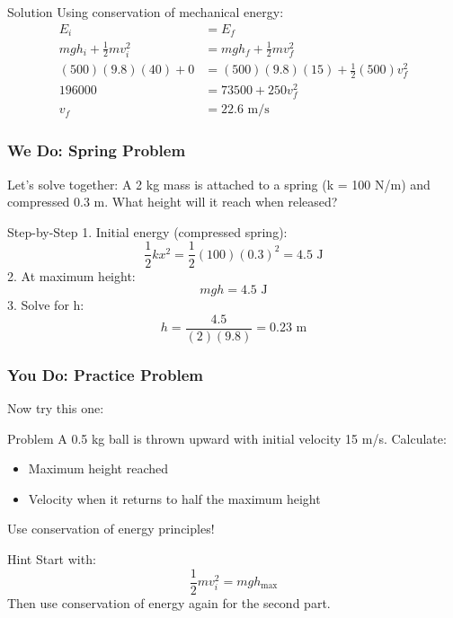 \documentclass{beamer}
\begin{document}
\begin{frame}
\begin{block}{Solution}
Using conservation of mechanical energy:
\begin{align*}
E_i &= E_f \\
mgh_i + \frac{1}{2}mv_i^2 &= mgh_f + \frac{1}{2}mv_f^2 \\
(500)(9.8)(40) + 0 &= (500)(9.8)(15) + \frac{1}{2}(500)v_f^2 \\
196000 &= 73500 + 250v_f^2 \\
v_f &= 22.6 \text{ m/s}
\end{align*}
\end{block}
\end{frame}

\begin{frame}
\frametitle{We Do: Spring Problem}
Let's solve together: A 2 kg mass is attached to a spring (k = 100 N/m) and compressed 0.3 m. What height will it reach when released?
\end{frame}

\begin{frame}
\begin{block}{Step-by-Step}
1. Initial energy (compressed spring):
\[\frac{1}{2}kx^2 = \frac{1}{2}(100)(0.3)^2 = 4.5 \text{ J}\]
2. At maximum height:
\[mgh = 4.5 \text{ J}\]
3. Solve for h:
\[h = \frac{4.5}{(2)(9.8)} = 0.23 \text{ m}\]
\end{block}
\end{frame}

\begin{frame}
\frametitle{You Do: Practice Problem}
Now try this one:

\begin{block}{Problem}
A 0.5 kg ball is thrown upward with initial velocity 15 m/s. Calculate:
\begin{itemize}
    \item Maximum height reached
    \item Velocity when it returns to half the maximum height
\end{itemize}
Use conservation of energy principles!
\end{block}
\pause
\begin{block}{Hint}
Start with:
\[\frac{1}{2}mv_i^2 = mgh_{\text{max}}\]
Then use conservation of energy again for the second part.
\end{block}
\end{frame}
\end{document}
